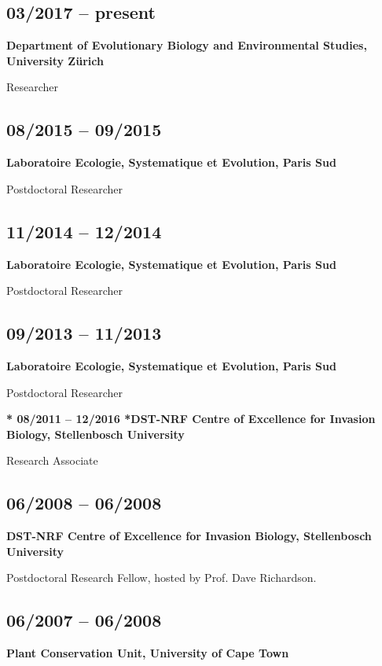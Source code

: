 \documentclass[a4paper]{article}
\begin{document}
\subsection{03/2017 -- present}

\textbf{Department of Evolutionary Biology and Environmental Studies, University Zürich}

Researcher

\subsection{08/2015 -- 09/2015}

\textbf{Laboratoire Ecologie, Systematique et Evolution, Paris Sud} 

Postdoctoral Researcher

\subsection{11/2014 -- 12/2014}

\textbf{Laboratoire Ecologie, Systematique et Evolution, Paris Sud} 

Postdoctoral Researcher

\subsection{09/2013 -- 11/2013}

\textbf{Laboratoire Ecologie, Systematique et Evolution, Paris Sud}

Postdoctoral Researcher

 \textbf{* 08/2011 -- 12/2016
*DST-NRF Centre of Excellence for Invasion Biology, Stellenbosch University}

Research Associate

\subsection{06/2008 -- 06/2008}

\textbf{DST-NRF Centre of Excellence for Invasion Biology, Stellenbosch University}

Postdoctoral Research Fellow, hosted by Prof. Dave Richardson.

\subsection{06/2007 -- 06/2008}

\textbf{Plant Conservation Unit, University of Cape Town} 
\end{document}
